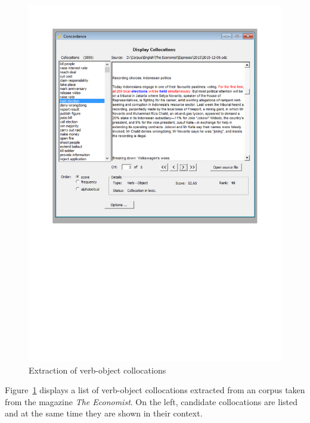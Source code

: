 \documentclass[output=paper]{langsci/langscibook}
\begin{document}
\begin{figure}[htbp]
      \includegraphics[scale=0.7, clip, trim=20mm 110mm 20mm 20mm]{figures/FipsCoPict.pdf}
\caption{\label{fou:figFips}Extraction of verb-object collocations}
\end{figure}


Figure~\ref{fou:figFips} displays a list of verb-object collocations extracted from an  corpus taken from the magazine \textit{The Economist}. On the left, candidate collocations are listed and at the same time they are shown in their context.
          
\end{document}
